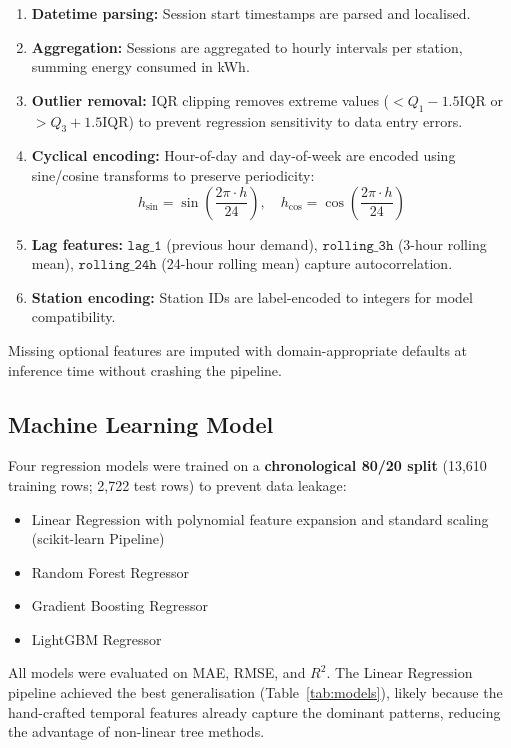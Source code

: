 \documentclass[12pt,a4paper]{article}
\begin{document}
\begin{enumerate}[leftmargin=*]
  \item \textbf{Datetime parsing:} Session start timestamps are parsed and localised.
  \item \textbf{Aggregation:} Sessions are aggregated to hourly intervals per station,
    summing energy consumed in kWh.
  \item \textbf{Outlier removal:} IQR clipping removes extreme values ($<Q_1-1.5\text{IQR}$
    or $>Q_3+1.5\text{IQR}$) to prevent regression sensitivity to data entry errors.
  \item \textbf{Cyclical encoding:} Hour-of-day and day-of-week are encoded using
    sine/cosine transforms to preserve periodicity:
    \[
      h_{\sin} = \sin\!\left(\frac{2\pi \cdot h}{24}\right),\quad
      h_{\cos} = \cos\!\left(\frac{2\pi \cdot h}{24}\right)
    \]
  \item \textbf{Lag features:} $\texttt{lag\_1}$ (previous hour demand),
    $\texttt{rolling\_3h}$ (3-hour rolling mean), $\texttt{rolling\_24h}$
    (24-hour rolling mean) capture autocorrelation.
  \item \textbf{Station encoding:} Station IDs are label-encoded to integers for
    model compatibility.
\end{enumerate}

Missing optional features are imputed with domain-appropriate defaults at inference
time without crashing the pipeline.

\subsection{Machine Learning Model}
\label{subsec:ml}

Four regression models were trained on a \textbf{chronological 80/20 split}
(13{,}610 training rows; 2{,}722 test rows) to prevent data leakage:

\begin{itemize}[leftmargin=*]
  \item Linear Regression with polynomial feature expansion and standard scaling
    (scikit-learn Pipeline)
  \item Random Forest Regressor
  \item Gradient Boosting Regressor
  \item LightGBM Regressor
\end{itemize}

All models were evaluated on MAE, RMSE, and $R^2$. The Linear Regression pipeline
achieved the best generalisation (Table~\ref{tab:models}), likely because the
hand-crafted temporal features already capture the dominant patterns, reducing the
advantage of non-linear tree methods.
\end{document}
